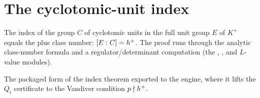 \section{The cyclotomic-unit index}\label{sec:unitindex}

\begin{theorem}\label{thm:unitindex}
  \leanok
  The index of the group $C$ of cyclotomic units in the full unit group $E$ of
  $K^{+}$ equals the plus class number: $[E:C] = h^{+}$. The proof runs through
  the analytic class-number formula and a regulator/determinant computation
  (the , , and $L$-value modules).
\end{theorem}

\begin{theorem}\label{thm:unitindexproof}
  \leanok
  The packaged form of the index theorem exported to the engine, where it lifts
  the $Q_i$ certificate to the Vandiver condition $p \nmid h^{+}$.
\end{theorem}
